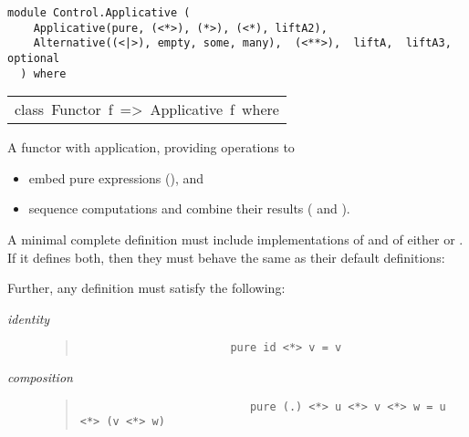 \label{module:Control.Applicative}
\haddockbeginheader
{\haddockverb\begin{verbatim}
module Control.Applicative (
    Applicative(pure, (<*>), (*>), (<*), liftA2), 
    Alternative((<|>), empty, some, many),  (<**>),  liftA,  liftA3,  optional
  ) where\end{verbatim}}
\haddockendheader

\begin{haddockdesc}
\item[\begin{tabular}{@{}l}
class\ Functor\ f\ =>\ Applicative\ f\ where
\end{tabular}]\haddockbegindoc
A functor with application, providing operations to\par
\begin{itemize}
\item
embed pure expressions (), and\par

\item
sequence computations and combine their results (\haddockid{<*>} and ).\par

\end{itemize}
A minimal complete definition must include implementations of 
 and of either \haddockid{<*>} or . If it defines both, then they must behave
 the same as their default definitions:\par
{}
      \par
Further, any definition must satisfy the following:\par
\begin{description}
\item[\emph{identity}] \begin{quote}
                       {\haddockverb\begin{verbatim}
                       pure id <*> v = v\end{verbatim}}
                       \end{quote}
                       
\item[\emph{composition}] \begin{quote}
                          {\haddockverb\begin{verbatim}
                          pure (.) <*> u <*> v <*> w = u <*> (v <*> w)\end{verbatim}}
                          \end{quote}
                          

\end{description}
\end{haddockdesc}
